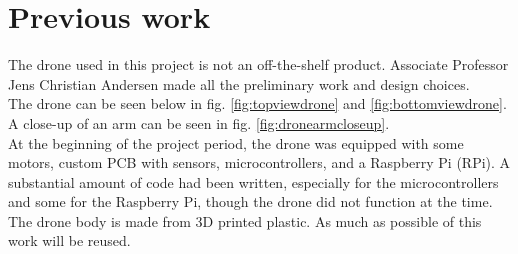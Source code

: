 \section{Previous work}
The drone used in this project is not an off-the-shelf product. Associate Professor Jens Christian Andersen made all the preliminary work and design choices.\\
The drone can be seen below in fig. \ref{fig:topviewdrone} and \ref{fig:bottomviewdrone}. A close-up of an arm can be seen in fig. \ref{fig:dronearmcloseup}.\\
At the beginning of the project period, the drone was equipped with some motors, custom PCB with sensors, microcontrollers, and a Raspberry Pi (RPi). A substantial amount of code had been written, especially for the microcontrollers and some for the Raspberry Pi, though the drone did not function at the time. 
The drone body is made from 3D printed plastic. As much as possible of this work will be reused.\\
